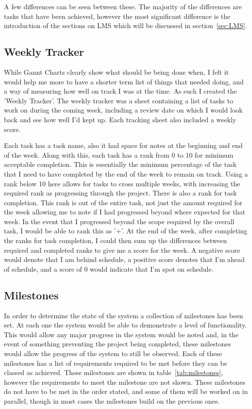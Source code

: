 A few differences can be seen between these.
The majority of the differences are tasks that have been achieved, however the most significant difference is the introduction of the sections on LMS which will be discussed in section~\ref{sec:LMS}.

\subsection{Weekly Tracker}
While Gannt Charts clearly show what should be being done when, I felt it would help me more to have a shorter term list of things that needed doing, and a way of measuring how well on track I was at the time. As such I created the 'Weekly Tracker'.
The weekly tracker was a sheet containing a list of tasks to work on during the coming week, including a review date on which I would look back and see how well I'd kept up. Each tracking sheet also included a weekly score.

Each task has a task name, also it had space for notes at the beginning and end of the week. Along with this, each task has a rank from 0 to 10 for minimum acceptable completion. This is essentially the minimum percentage of the task that I need to have completed by the end of the week to remain on track. Using a rank below 10 here allows for tasks to cross multiple weeks, with increasing the required rank as progressing through the project.
There is also a rank for task completion. This rank is out of the entire task, not just the amount required for the week allowing me to note if I had progressed beyond where expected for that week. In the event that I progressed beyond the scope required by the overall task, I would be able to rank this as '+'.
At the end of the week, after completing the ranks for task completion, I could then sum up the differences between required and completed ranks to give me a score for the week.
A negative score would denote that I am behind schedule, a positive score denotes that I'm ahead of schedule, and a score of 0 would indicate that I'm spot on schedule.

\subsection{Milestones}
In order to determine the state of the system a collection of milestones has been set.
At each one the system would be able to demonstrate a level of functionality.
This would allow any major progress in the system would be noted and, in the event of something preventing the project being completed, these milestones would allow the progress of the system to still be observed.
Each of these milestones has a list of requirements required to be met before they can be classed as achieved.
These milestones are shown in table~\ref{tab:milestones}, however the requirements to meet the milestone are not shown.
These milestones do not have to be met in the order stated, and some of them will be worked on in parallel, though in most cases the milestones build on the previous ones.

